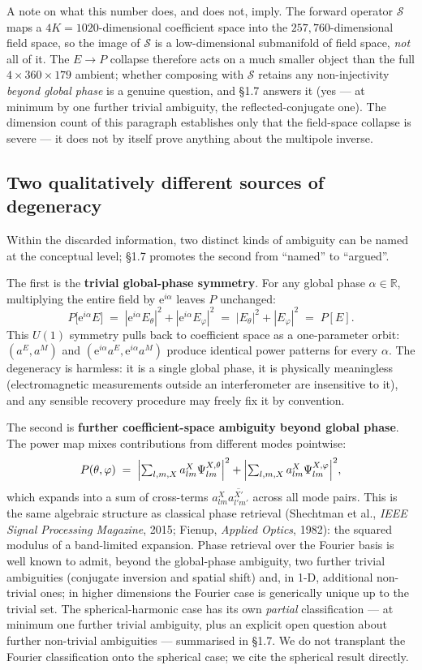 \documentclass[11pt,a4paper]{report}
\begin{document}
A note on what this number does, and does not, imply. The forward operator
$\mathcal S$ maps a $4K = 1020$-dimensional coefficient space into the
$257{,}760$-dimensional field space, so the image of $\mathcal S$ is a
low-dimensional submanifold of field space, \emph{not} all of it. The $E\to P$
collapse therefore acts on a much smaller object than the full
$4\times 360\times 179$ ambient; whether composing with $\mathcal S$ retains any
non-injectivity \emph{beyond global phase} is a genuine question, and \S1.7 answers
it (yes --- at minimum by one further trivial ambiguity, the reflected-conjugate
one). The dimension count of this paragraph establishes only that the field-space
collapse is severe --- it does not by itself prove anything about the multipole
inverse.

\subsection*{Two qualitatively different sources of degeneracy}

Within the discarded information, two distinct kinds of ambiguity can be named at
the conceptual level; \S1.7 promotes the second from \enquote{named} to
\enquote{argued}.

The first is the \textbf{trivial global-phase symmetry}. For any global phase
$\alpha\in\mathbb{R}$, multiplying the entire field by $\mathrm{e}^{i\alpha}$ leaves
$P$ unchanged:
\[
P\bigl[\mathrm{e}^{i\alpha} E\bigr] \;=\; |\mathrm{e}^{i\alpha}E_\theta|^2 + |\mathrm{e}^{i\alpha}E_\varphi|^2 \;=\; |E_\theta|^2 + |E_\varphi|^2 \;=\; P[E].
\]
This $U(1)$ symmetry pulls back to coefficient space as a one-parameter orbit:
$(a^E, a^M)$ and $(\mathrm{e}^{i\alpha}a^E, \mathrm{e}^{i\alpha}a^M)$ produce
identical power patterns for every $\alpha$. The degeneracy is harmless: it is a
single global phase, it is physically meaningless (electromagnetic measurements
outside an interferometer are insensitive to it), and any sensible recovery procedure
may freely fix it by convention.

The second is \textbf{further coefficient-space ambiguity beyond global phase}. The
power map mixes contributions from different modes pointwise:
\[
P(\theta,\varphi) \;=\; \Bigl|\textstyle\sum_{l,m,X} a^X_{lm}\Psi^{X,\theta}_{lm}\Bigr|^2 + \Bigl|\textstyle\sum_{l,m,X} a^X_{lm}\Psi^{X,\varphi}_{lm}\Bigr|^2,
\]
which expands into a sum of cross-terms $a^X_{lm}\overline{a^{X'}_{l'm'}}$ across
all mode pairs. This is the same algebraic structure as classical phase retrieval
(Shechtman et al., \emph{IEEE Signal Processing Magazine}, 2015; Fienup,
\emph{Applied Optics}, 1982): the squared modulus of a band-limited expansion. Phase
retrieval over the Fourier basis is well known to admit, beyond the global-phase
ambiguity, two further trivial ambiguities (conjugate inversion and spatial shift)
and, in 1-D, additional non-trivial ones; in higher dimensions the Fourier case is
generically unique up to the trivial set. The spherical-harmonic case has its own
\emph{partial} classification --- at minimum one further trivial ambiguity, plus an
explicit open question about further non-trivial ambiguities --- summarised in \S1.7.
We do not transplant the Fourier classification onto the spherical case; we cite the
spherical result directly.
\end{document}
